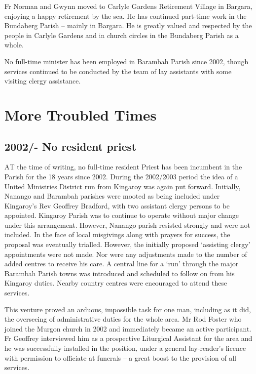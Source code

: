 Fr Norman and Gwynn moved to Carlyle Gardens Retirement Village in Bargara, enjoying a happy retirement by the sea. He has continued part-time work in the Bundaberg Parish -- mainly in Bargara. He is greatly valued and respected by the people in Carlyle Gardens and in church circles in the Bundaberg Parish as a whole.



No full-time minister has been employed in Barambah Parish since 2002, though services continued to be conducted by the team of lay assistants with some visiting clergy assistance.



\balance


\printendnotes[custom]
\setcounter{endnote}{0}
\chapter{More Troubled Times}
\nobalance


\section{2002/- No resident priest}



\lettrine[lines=3]{A}{T}
 the time of writing, no full-time resident Priest has been incumbent in the Parish for the 18 years since 2002. During the 2002/2003 period the idea of a United Ministries District run from Kingaroy was again put forward. Initially, Nanango and Barambah parishes were mooted as being included under Kingaroy's Rev Geoffrey Bradford, with two assistant clergy persons to be appointed. Kingaroy Parish was to continue to operate without major change under this arrangement. However, Nanango parish resisted strongly and were not included. In the face of local misgivings along with prayers for success, the proposal was eventually trialled. However, the initially proposed `assisting clergy' appointments were not made. Nor were any adjustments made to the number of added centres to receive his care. A central line for a `run' through the major Barambah Parish towns was introduced and scheduled to follow on from his Kingaroy duties. Nearby country centres were encouraged to attend these services.

This venture proved an arduous, impossible task for one man, including as it did, the overseeing of administrative duties for the whole area. Mr Rod Foster who joined the Murgon church in 2002 and immediately became an active participant. Fr Geoffrey interviewed him as a prospective Liturgical Assistant for the area and he was successfully installed in the position, under a general lay-reader's licence with permission to officiate at funerals -- a great boost to the provision of all services.




